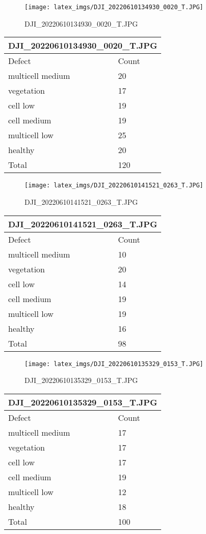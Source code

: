 \documentclass{article}%
\begin{document}
\begin{figure}[h!]%
\centering%
\texttt{[image: latex\_imgs/DJI\_20220610134930\_0020\_T.JPG]}%
\caption{DJI\_20220610134930\_0020\_T.JPG}%
\end{figure}

%
\begin{longtable}[c]{|l|l|}%
\hline%
\multicolumn{2}{|c|}{DJI\_20220610134930\_0020\_T.JPG}\\%
\hline%
Defect&Count\\%
\hline%
\endhead%
\hline%
multicell medium&20\\%
vegetation&17\\%
cell low&19\\%
cell medium&19\\%
multicell low&25\\%
healthy&20\\%
\hline%
Total&120\\%
\hline%
\end{longtable}%


\begin{figure}[h!]%
\centering%
\texttt{[image: latex\_imgs/DJI\_20220610141521\_0263\_T.JPG]}%
\caption{DJI\_20220610141521\_0263\_T.JPG}%
\end{figure}

%
\begin{longtable}[c]{|l|l|}%
\hline%
\multicolumn{2}{|c|}{DJI\_20220610141521\_0263\_T.JPG}\\%
\hline%
Defect&Count\\%
\hline%
\endhead%
\hline%
multicell medium&10\\%
vegetation&20\\%
cell low&14\\%
cell medium&19\\%
multicell low&19\\%
healthy&16\\%
\hline%
Total&98\\%
\hline%
\end{longtable}%
\newpage%


\begin{figure}[h!]%
\centering%
\texttt{[image: latex\_imgs/DJI\_20220610135329\_0153\_T.JPG]}%
\caption{DJI\_20220610135329\_0153\_T.JPG}%
\end{figure}

%
\begin{longtable}[c]{|l|l|}%
\hline%
\multicolumn{2}{|c|}{DJI\_20220610135329\_0153\_T.JPG}\\%
\hline%
Defect&Count\\%
\hline%
\endhead%
\hline%
multicell medium&17\\%
vegetation&17\\%
cell low&17\\%
cell medium&19\\%
multicell low&12\\%
healthy&18\\%
\hline%
Total&100\\%
\hline%
\end{longtable}%
\end{document}
